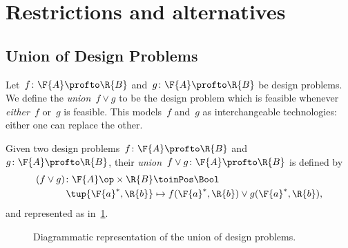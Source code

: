 

\section{Restrictions and alternatives}

\subsection{Union of Design Problems}
Let~$f\colon \F{A}\profto \R{B}$ and~$g\colon \F{A}\profto \R{B}$ be design problems. We define the \emph{union}~$f \vee g$ to be the design problem which is feasible whenever \emph{either}~$f$ or~$g$ is feasible.
This models~$f$ and~$g$ as interchangeable technologies: either one can replace the other.

\begin{definition}
    Given two design problems~$f \colon \F{A} \profto \R{B}$ and~$g \colon \F{A} \profto \R{B}$, their \emph{union}~$f \vee g \colon \F{A} \profto \R{B}$ is defined by
    \begin{equation}
        \begin{aligned}
        (f \vee g)
            \colon \F{A}\op \times \R{B} & \toinPos \Bool \\
            \tup{\F{a}^*, \R{b}} & \mapsto f(\F{a}^*, \R{b}) \vee g(\F{a}^*, \R{b}),
        \end{aligned}
    \end{equation}
    and represented as in~\cref{fig:uniondp}.
\end{definition}

\begin{figure}[h!]
    \begin{center}
    \end{center}
    \caption{Diagrammatic representation of the union of design problems. \label{fig:uniondp}}
\end{figure}


